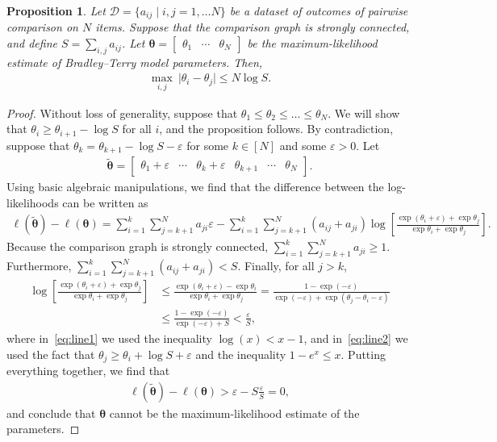\documentclass[12pt,a4paper,oneside]{article}
\theoremstyle{plain}
\newtheorem{proposition}{Proposition}
\begin{document}
\begin{proposition}
Let $\mathcal{D} = \{ a_{ij} \mid i, j = 1, \ldots N \}$ be a dataset of outcomes of pairwise comparison on $N$ items.
Suppose that the comparison graph is strongly connected, and define $S = \sum_{i, j} a_{ij}$.
Let $\bm{\theta} = \begin{bmatrix}\theta_1 & \cdots & \theta_N \end{bmatrix}$ be the maximum-likelihood estimate of Bradley--Terry model parameters.
Then,
\begin{align*}
\max_{i, j} \ \lvert \theta_i - \theta_j \rvert \le N \log S.
\end{align*}
\end{proposition}

\begin{proof}
Without loss of generality, suppose that $\theta_1 \le \theta_2 \le \ldots \le \theta_N$.
We will show that $\theta_i \ge \theta_{i+1} - \log S$ for all $i$, and the proposition follows.
By contradiction, suppose that $\theta_k = \theta_{k+1} - \log S - \varepsilon$ for some $k \in [N]$ and some $\varepsilon > 0$.
Let
\begin{align*}
\tilde{\bm{\theta}} =
\begin{bmatrix}
\theta_1 + \varepsilon & \cdots & \theta_k + \varepsilon & \theta_{k+1} & \cdots & \theta_N
\end{bmatrix}.
\end{align*}
Using basic algebraic manipulations, we find that the difference between the log-likelihoods can be written as
\begin{align*}
\ell(\tilde{\bm{\theta}}) - \ell(\bm{\theta}) =
    \sum_{i=1}^k \sum_{j = k+1}^N a_{ji} \varepsilon
  - \sum_{i=1}^k \sum_{j = k+1}^N (a_{ij} + a_{ji})
        \log \left[ \frac{\exp(\theta_i + \varepsilon) + \exp \theta_j}{\exp \theta_i + \exp \theta_j} \right].
\end{align*}
Because the comparison graph is strongly connected, $\sum_{i=1}^k \sum_{j = k+1}^N a_{ji} \ge 1$.
Furthermore, $\sum_{i=1}^k \sum_{j = k+1}^N (a_{ij} + a_{ji}) < S$.
Finally, for all $j > k$,
\begin{align}
\log \left[ \frac{\exp(\theta_i + \varepsilon) + \exp \theta_j}{\exp \theta_i + \exp \theta_j} \right]
    &\le \frac{\exp(\theta_i + \varepsilon) - \exp \theta_i}{\exp \theta_i + \exp \theta_j}
       = \frac{1 - \exp(-\varepsilon)}{\exp(-\varepsilon) + \exp(\theta_j - \theta_i - \varepsilon)} \label{eq:line1}\\
    &\le \frac{1 - \exp(-\varepsilon)}{\exp(-\varepsilon) + S}
       < \frac{\varepsilon}{S}, \label{eq:line2}
\end{align}
where in~\eqref{eq:line1} we used the inequality $\log(x) < x - 1$, and in~\eqref{eq:line2} we used the fact that $\theta_j \ge \theta_i + \log S + \varepsilon$ and the inequality $1 - e^x \le x$.
Putting everything together, we find that
\begin{align*}
\ell(\tilde{\bm{\theta}}) - \ell(\bm{\theta}) > \varepsilon - S \frac{\varepsilon}{S} = 0,
\end{align*}
and conclude that $\bm{\theta}$ cannot be the maximum-likelihood estimate of the parameters.
\end{proof}
\end{document}

